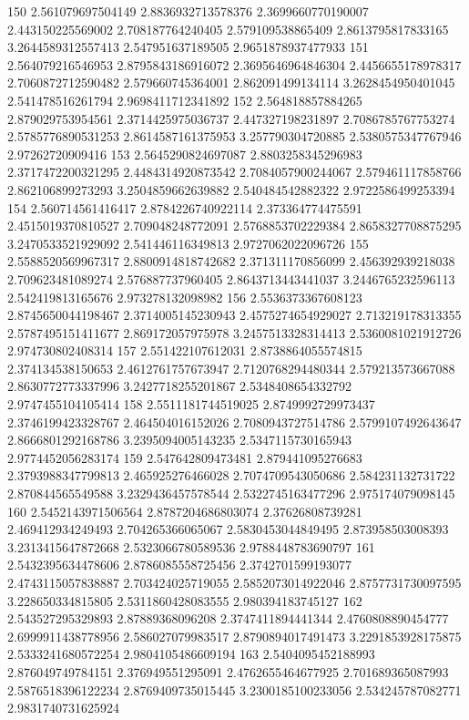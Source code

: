 150 2.561079697504149 2.8836932713578376 2.3699660770190007 2.443150225569002 2.708187764240405 2.579109538865409 2.8613795817833165 3.2644589312557413 2.547951637189505 2.9651878937477933
151 2.564079216546953 2.8795843186916072 2.3695646964846304 2.4456655178978317 2.7060872712590482 2.579660745364001 2.862091499134114 3.2628454950401045 2.541478516261794 2.9698411712341892
152 2.564818857884265 2.879029753954561 2.3714425975036737 2.447327198231897 2.7086785767753274 2.5785776890531253 2.8614587161375953 3.257790304720885 2.5380575347767946 2.97262720909416
153 2.5645290824697087 2.8803258345296983 2.3717472200321295 2.4484314920873542 2.7084057900244067 2.579461117858766 2.862106899273293 3.2504859662639882 2.540484542882322 2.9722586499253394
154 2.560714561416417 2.8784226740922114 2.373364774475591 2.4515019370810527 2.709048248772091 2.5768853702229384 2.8658327708875295 3.2470533521929092 2.541446116349813 2.9727062022096726
155 2.5588520569967317 2.8800914818742682 2.371311170856099 2.456392939218038 2.709623481089274 2.576887737960405 2.8643713443441037 3.2446765232596113 2.542419813165676 2.973278132098982
156 2.5536373367608123 2.8745650044198467 2.3714005145230943 2.4575274654929027 2.713219178313355 2.5787495151411677 2.869172057975978 3.2457513328314413 2.5360081021912726 2.974730802408314
157 2.551422107612031 2.8738864055574815 2.374134538150653 2.4612761757673947 2.7120768294480344 2.579213573667088 2.8630772773337996 3.2427718255201867 2.5348408654332792 2.9747455104105414
158 2.5511181744519025 2.8749992729973437 2.3746199423328767 2.464504016152026 2.7080943727514786 2.5799107492643647 2.8666801292168786 3.2395094005143235 2.5347115730165943 2.9774452056283174
159 2.547642809473481 2.879441095276683 2.3793988347799813 2.465925276466028 2.7074709543050686 2.584231132731722 2.870844565549588 3.2329436457578544 2.5322745163477296 2.975174079098145
160 2.5452143971506564 2.8787204686803074 2.37626808739281 2.469412934249493 2.704265366065067 2.5830453044849495 2.873958503008393 3.2313415647872668 2.5323066780589536 2.9788448783690797
161 2.5432395634478606 2.8786085558725456 2.3742701599193077 2.4743115057838887 2.703424025719055 2.5852073014922046 2.8757731730097595 3.228650334815805 2.5311860428083555 2.980394183745127
162 2.543527295329893 2.87889368096208 2.3747411894441344 2.4760808890454777 2.6999911438778956 2.586027079983517 2.8790894017491473 3.2291853928175875 2.5333241680572254 2.9804105486609194
163 2.5404095452188993 2.876049749784151 2.376949551295091 2.4762655464677925 2.701689365087993 2.5876518396122234 2.8769409735015445 3.2300185100233056 2.534245787082771 2.9831740731625924

